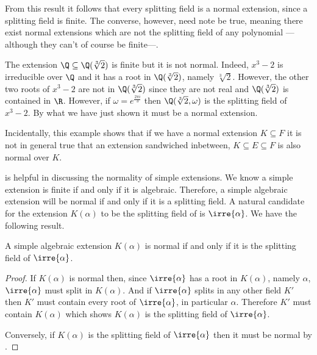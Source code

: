 \documentclass[12pt,oneside]{book}
\begin{document}
From this result it follows that every splitting field is a normal extension, since a
splitting field is finite. The converse, however, need note be true, meaning there exist
normal extensions which are not the splitting field of any polynomial ---although they
can't of course be finite---.

\begin{example}
	The extension \( \Q \subseteq \Q(\sqrt[3]{2}) \) is finite but it is not normal. Indeed,
	\( x^3 - 2 \) is irreducible over \( \Q \) and it has a root in \( \Q(\sqrt[3]{2}) \),
	namely \( \sqrt[3]{2} \). However, the other two roots of \( x^3 - 2 \) are not in \(
	\Q(\sqrt[3]{2}) \) since they are not real and \( \Q(\sqrt[3]{2}) \) is contained in \( \R
	\). However, if \( \omega = e^{\frac{2 \pi i}{3}} \) then \( \Q(\sqrt[3]{2}, \omega) \) is
	the splitting field of \( x^3 - 2 \). By what we have just shown it must be a normal
	extension.

	Incidentally, this example shows that if we have a normal extension \( K \subseteq F \) it
	is not in general true that an extension sandwiched inbetween, \( K \subseteq E \subseteq
	F\) is also normal over \( K \). 
\end{example}

 is helpful in discussing the normality
of simple extensions. We know a simple extension is finite if and only if it is algebraic.
Therefore, a simple algebraic extension will be normal if and only if it is a splitting
field. A natural candidate for the extension \( K(\alpha) \) to be the splitting field of
is \( \irre{\alpha} \). We have the following result.
\begin{proposition}
	A simple algebraic extension \( K(\alpha) \) is normal if and only if it is the
	splitting field of \( \irre{\alpha} \).
\end{proposition}
\begin{proof}
	If \( K(\alpha) \) is normal then, since \( \irre{\alpha} \) has a root in \( K(\alpha)
	\), namely \( \alpha \), \( \irre{\alpha} \) must split in \( K(\alpha) \). And if \(
	\irre{\alpha} \) splits in any other field \( K' \) then \( K' \) must contain every
	root of \( \irre{\alpha} \), in particular \( \alpha \). Therefore \( K' \) must contain
	\( K(\alpha) \) which shows \( K(\alpha) \) is the splitting field of \( \irre{\alpha}
	\).

	Conversely, if \( K(\alpha) \) is the splitting field of \( \irre{\alpha} \) then it
	must be normal by .
\end{proof}
\end{document}
